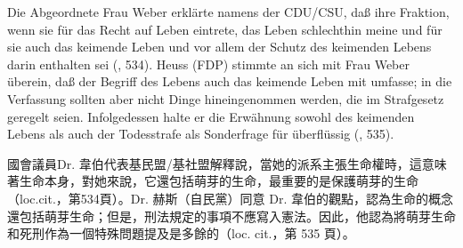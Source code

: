 \documentclass[12pt]{article}
\begin{document}
\syncleft
\begin{sourcepara}
Die Abgeordnete Frau \abbrDr{} Weber erklärte namens der CDU/CSU, daß ihre Fraktion, wenn sie für das Recht auf Leben eintrete, das Leben schlechthin meine und für sie auch das keimende Leben und vor allem der Schutz des keimenden Lebens darin enthalten sei (\abbrAAO{}, \abbrS{} 534). \abbrDr{} Heuss (FDP) stimmte an sich mit Frau \abbrDr{} Weber überein, daß der Begriff des Lebens auch das keimende Leben mit umfasse; in die Verfassung sollten aber nicht Dinge hineingenommen werden, die im Strafgesetz geregelt seien. Infolgedessen halte er die Erwähnung sowohl des keimenden Lebens als auch der Todesstrafe als Sonderfrage für überflüssig (\abbrAAO{}, \abbrS{} 535).
\end{sourcepara}
\begin{transpara}
國會議員Dr. 韋伯代表基民盟/基社盟解釋說，當她的派系主張生命權時，這意味著生命本身，對她來說，它還包括萌芽的生命，最重要的是保護萌芽的生命（loc.cit.，第534頁）。Dr. 赫斯（自民黨）同意 Dr. 韋伯的觀點，認為生命的概念還包括萌芽生命；但是，刑法規定的事項不應寫入憲法。因此，他認為將萌芽生命和死刑作為一個特殊問題提及是多餘的（loc. cit.，第 535 頁）。
\end{transpara}
\end{document}
